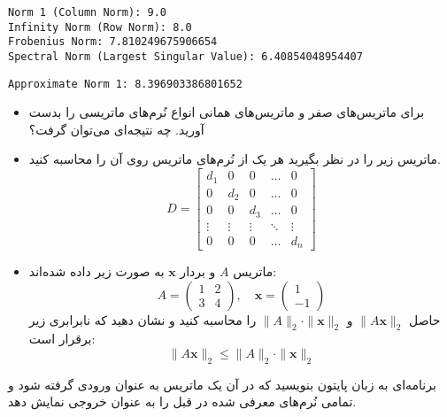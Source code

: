 \begin{code}
	\begin{latin}
		 
		\texttt{Norm 1 (Column Norm): 9.0\\
			Infinity Norm (Row Norm): 8.0\\
			Frobenius Norm: 7.810249675906654\\
			Spectral Norm (Largest Singular Value): 6.40854048954407 }
	\end{latin}
\end{code}

\begin{code}
	\begin{latin}
		  
		\texttt{Approximate Norm 1: 8.396903386801652}
	\end{latin}
\end{code}
\begin{exercise}
	\begin{itemize}
		\item 
		برای ماتریس‌های صفر و ماتریس‌های همانی انواع نُرم‌های ماتریسی را بدست آورید. چه نتیجه‌ای می‌توان گرفت؟
		\item 
		ماتریس زیر را در نظر بگیرید هر یک از نُرم‌های ماتریس روی آن را محاسبه کنید.
		\[
		D =
		\begin{bmatrix}
			d_1 & 0 & 0 & \dots & 0 \\
			0 & d_2 & 0 & \dots & 0 \\
			0 & 0 & d_3 & \dots & 0 \\
			\vdots & \vdots & \vdots & \ddots & \vdots \\
			0 & 0 & 0 & \dots & d_n
		\end{bmatrix}
		\]
		\item
		ماتریس \( A \) و بردار \( \mathbf{x} \) به صورت زیر داده شده‌اند:
		\[
		A = \begin{pmatrix}
			1 & 2 \\
			3 & 4
		\end{pmatrix}, \quad
		\mathbf{x} = \begin{pmatrix}
			1 \\
			-1
		\end{pmatrix}
		\]
		حاصل \( \|A\mathbf{x}\|_2 \) و \( \|A\|_2 \cdot \|\mathbf{x}\|_2 \) را محاسبه کنید و نشان دهید که نابرابری زیر برقرار است:
		\[
		\|A\mathbf{x}\|_2 \leq \|A\|_2 \cdot \|\mathbf{x}\|_2
		\]
	\end{itemize}
\end{exercise}
\begin{exercise}
	برنامه‌ای به زبان پایتون بنویسید که در آن یک ماتریس به عنوان ورودی گرفته شود و تمامی نُرم‌های معرفی شده در قبل را به عنوان خروجی نمایش دهد.
\end{exercise}

